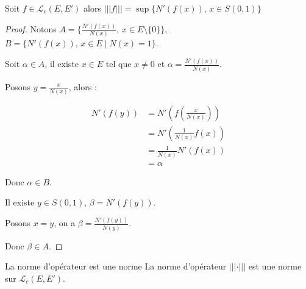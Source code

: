 \begin{proposition}{}{}
    Soit $f \in \mathscr L_c(E, E')$ alors $|||f||| = \sup \{ N'(f(x)), \, x \in S(0, 1) \}$
\end{proposition}

\begin{proof}
    Notons $A = \{\frac{N'(f(x))}{N(x)}, \, x \in E \setminus \{0\}\}$,
    $B = \{N'(f(x)), \, x \in E \mid N(x) = 1\}$.

    Soit $\alpha \in A$, il existe $x \in E $ tel que $x \neq 0$ et $\alpha = \frac{N'(f(x))}{N(x)}$.

    Posons $y = \frac x {N(x)}$, alors : 

    \begin{align*}
        N'(f(y)) & = N'\left( f\left( \frac x {N(x)} \right) \right) \\
        & = N'\left( \frac{1}{N(x)} f(x) \right) \\
        & = \frac{1}{N(x)} N'(f(x)) \\
        & = \alpha
    \end{align*}

    Donc $\alpha \in B$. 

    Il existe $y \in S(0, 1)$, $\beta = N'(f(y))$. 

    Posons $x = y$, on a $\beta = \frac{N'(f(y))}{N(y)}$. 

    Donc $\beta \in A$.
\end{proof}

\begin{theoreme}{La norme d'opérateur est une norme}{}
    La norme d'opérateur $|||\cdot|||$ est une norme sur $\mathscr L_c(E, E')$.
\end{theoreme}


